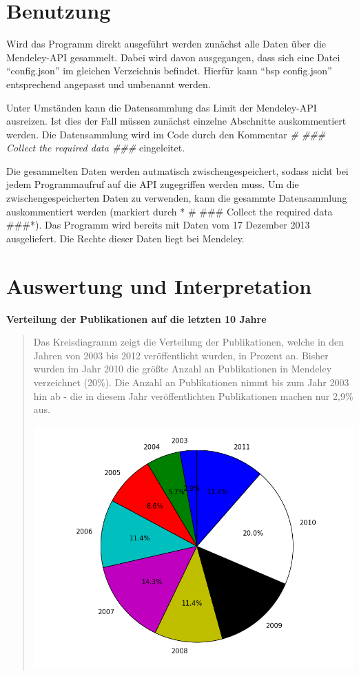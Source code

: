 \documentclass[letterpaper,10pt,english]{sphinxmanual}
\begin{document}
\section{Benutzung}
\label{project_3:benutzung}
Wird das Programm direkt ausgeführt werden zunächst alle Daten über die Mendeley-API gesammelt. Dabei wird davon ausgegangen, dass sich eine Datei ``config.json'' im gleichen Verzeichnis befindet. Hierfür kann ``bsp config.json'' entsprechend angepasst und umbenannt werden.

Unter Umständen kann die Datensammlung das Limit der Mendeley-API ausreizen. Ist dies der Fall müssen zunächst einzelne Abschnitte auskommentiert werden. Die Datensammlung wird im Code durch den Kommentar \emph{\# \#\#\# Collect the required data \#\#\#} eingeleitet.

Die gesammelten Daten werden autmatisch zwischengespeichert, sodass nicht bei jedem Programmaufruf auf die API zugegriffen werden muss. Um die zwischengespeicherten Daten zu verwenden, kann die gesammte Datensammlung auskommentiert werden (markiert durch * \# \#\#\# Collect the required data \#\#\#*).
Das Programm wird bereits mit Daten vom 17 Dezember 2013 ausgeliefert. Die Rechte dieser Daten liegt bei Mendeley.


\section{Auswertung und Interpretation}
\label{project_3:auswertung-und-interpretation}
\textbf{Verteilung der Publikationen auf die letzten 10 Jahre}
\begin{quote}

Das Kreisdiagramm zeigt die Verteilung der Publikationen, welche in den Jahren von 2003 bis 2012 veröffentlicht wurden, in Prozent an. Bisher wurden im Jahr 2010 die größte Anzahl an Publikationen in Mendeley verzeichnet (20\%). Die Anzahl an Publikationen nimmt bis zum Jahr 2003 hin ab - die in diesem Jahr veröffentlichten Publikationen machen nur 2,9\% aus.

\includegraphics{Verteilung_overall.png}
\end{quote}
\end{document}
